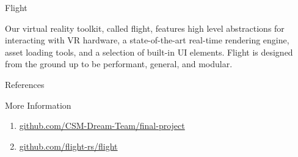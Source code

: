 \documentclass[final]{beamer}
\newlength{\sepwid}
\newlength{\onecolwid}
\begin{document}
\begin{frame}[t]
\begin{columns}[t]
            \begin{column}{\sepwid}\end{column} %

            \begin{column}{\onecolwid} %

                \begin{block}{Flight}
                    \setlength{\parskip}{0.5em}

                    Our virtual reality toolkit, called flight, features high
                    level abstractions for interacting with VR hardware, a
                    state-of-the-art real-time rendering engine, asset loading
                    tools, and a selection of built-in UI elements. Flight is
                    designed from the ground up to be performant, general, and
                    modular.

                \end{block}

                \begin{block}{References}
                    \printbibliography
                \end{block}


                \begin{alertblock}{More Information}

                    \begin{enumerate}[leftmargin=6.5cm, labelsep=1cm]

                        \item[\textbf{Project}]
                            \href{https://github.com/CSM-Dream-Team/final-project}{\url{github.com/CSM-Dream-Team/final-project}}

                        \item[\textbf{Flight}]
                            \href{https://github.com/flight-rs/flight}{\url{github.com/flight-rs/flight}}
                    \end{enumerate}

                \end{alertblock}
            \end{column} %


\end{columns}
\end{frame}
\end{document}
